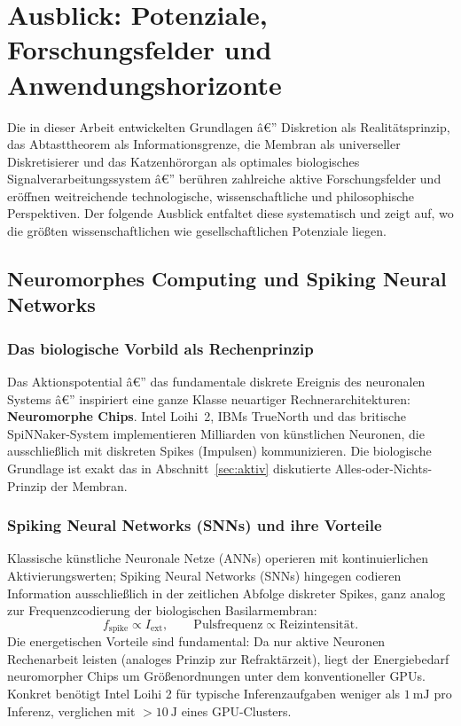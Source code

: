 ﻿\documentclass[12pt,a4paper,titlepage]{report}
\begin{document}
\chapter{Ausblick: Potenziale, Forschungsfelder und Anwendungshorizonte}

Die in dieser Arbeit entwickelten Grundlagen â€” Diskretion als Realitätsprinzip, das
Abtasttheorem als Informationsgrenze, die Membran als universeller Diskretisierer und
das Katzenhörorgan als optimales biologisches Signalverarbeitungssystem â€” berühren
zahlreiche aktive Forschungsfelder und eröffnen weitreichende technologische,
wissenschaftliche und philosophische Perspektiven. Der folgende Ausblick entfaltet diese
systematisch und zeigt auf, wo die größten wissenschaftlichen wie gesellschaftlichen
Potenziale liegen.

\section{Neuromorphes Computing und Spiking Neural Networks}

\subsection{Das biologische Vorbild als Rechenprinzip}

Das Aktionspotential â€” das fundamentale diskrete Ereignis des neuronalen Systems â€”
inspiriert eine ganze Klasse neuartiger Rechnerarchitekturen: \textbf{Neuromorphe
Chips}. Intel Loihi~2, IBMs TrueNorth und das britische SpiNNaker-System
implementieren Milliarden von künstlichen Neuronen, die ausschließlich mit diskreten
Spikes (Impulsen) kommunizieren. Die biologische Grundlage ist exakt das in
Abschnitt~\ref{sec:aktiv} diskutierte Alles-oder-Nichts-Prinzip der Membran.

\subsection{Spiking Neural Networks (SNNs) und ihre Vorteile}

Klassische künstliche Neuronale Netze (ANNs) operieren mit kontinuierlichen
Aktivierungswerten; Spiking Neural Networks (SNNs) hingegen codieren Information
ausschließlich in der zeitlichen Abfolge diskreter Spikes, ganz analog zur
Frequenzcodierung der biologischen Basilarmembran:
\[
    f_{\text{spike}} \propto I_{\text{ext}}, \qquad
    \text{Pulsfrequenz} \propto \text{Reizintensität.}
\]
Die energetischen Vorteile sind fundamental: Da nur aktive Neuronen Rechenarbeit leisten
(analoges Prinzip zur Refraktärzeit), liegt der Energiebedarf
neuromorpher Chips um Größenordnungen unter dem konventioneller GPUs.
Konkret benötigt Intel Loihi 2 für typische Inferenzaufgaben weniger als
$\SI{1}{\milli\joule}$ pro Inferenz, verglichen mit $>\SI{10}{\joule}$ eines
GPU-Clusters.
\end{document}
